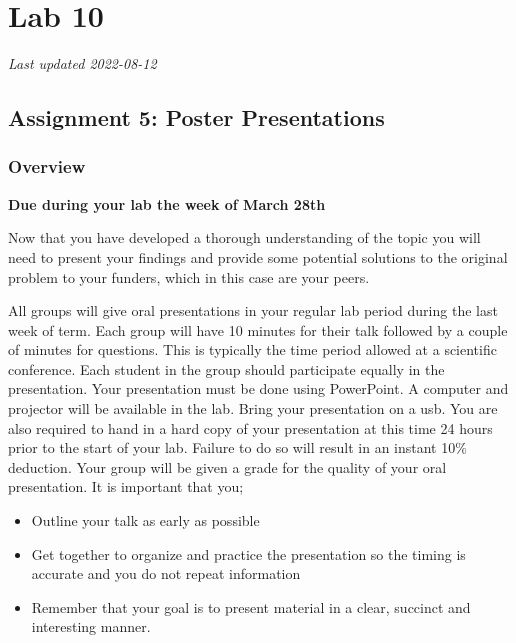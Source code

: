 \documentclass[
]{book}
\providecommand{\tightlist}{%
  \setlength{\itemsep}{0pt}\setlength{\parskip}{0pt}}
\begin{document}
\hypertarget{part-lab-10}{%
\part*{Lab 10}\label{part-lab-10}}

\emph{Last updated 2022-08-12}

\hypertarget{assignment-5-poster-presentations}{%
\chapter*{Assignment 5: Poster Presentations}\label{assignment-5-poster-presentations}}

\hypertarget{overview-2}{%
\section*{Overview}\label{overview-2}}

\textbf{Due during your lab the week of March 28th}

Now that you have developed a thorough understanding of the topic you will need to present your findings and provide some potential solutions to the original problem to your funders, which in this case are your peers.

All groups will give oral presentations in your regular lab period during the last week of term. Each group will have 10 minutes for their talk followed by a couple of minutes for questions. This is typically the time period allowed at a scientific conference. Each student in the group should participate equally in the presentation. Your presentation must be done using PowerPoint. A computer and projector will be available in the lab. Bring your presentation on a usb. You are also required to hand in a hard copy of your presentation at this time 24 hours prior to the start of your lab. Failure to do so will result in an instant 10\% deduction. Your group will be given a grade for the quality of your oral presentation. It is important that you;

\begin{itemize}
\tightlist
\item
  Outline your talk as early as possible
\item
  Get together to organize and practice the presentation so the timing is accurate and you do not repeat information
\item
  Remember that your goal is to present material in a clear, succinct and interesting manner.
\end{itemize}
\end{document}
